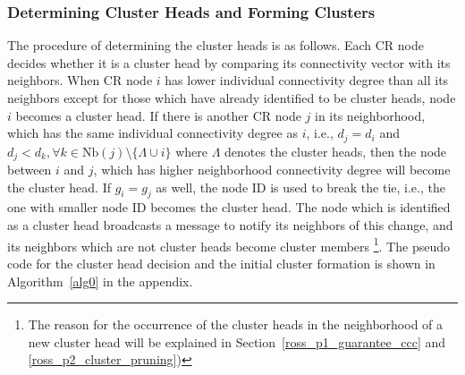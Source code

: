 \documentclass[times]{ettauth}
\newcommand{\ie}{i.e., }
\theoremstyle{mytheoremstyle}
\theoremstyle{mytheoremstyle}
\theoremstyle{mytheoremstyle}
\begin{document}
\subsubsection{Determining Cluster Heads and Forming Clusters}
The procedure of determining the cluster heads is as follows.
Each CR node decides whether it is a cluster head by comparing its connectivity vector with its neighbors.
When CR node $i$ has lower individual connectivity degree than all its neighbors except for those which have already identified to be cluster heads, node $i$ becomes a cluster head.
If there is another CR node $j$ in its neighborhood, which has the same individual connectivity degree as $i$, \ie $d_j = d_i$ and $d_j < d_{k}, \forall k\in \text{Nb}(j)\setminus \{\Lambda\cup i\}$ where $\Lambda$ denotes the cluster heads, then the node between $i$ and $j$, which has higher neighborhood connectivity degree will become the cluster head.
If $g_i = g_j$ as well, the node ID is used to break the tie, \ie the one with smaller node ID becomes the cluster head.
%
The node which is identified as a cluster head broadcasts a message to notify its neighbors of this change, and its neighbors which are not cluster heads become cluster members
\footnote{The reason for the occurrence of the cluster heads in the neighborhood of a new cluster head will be explained in Section~\ref{ross_p1_guarantee_ccc} and \ref{ross_p2_cluster_pruning})}.
The pseudo code for the cluster head decision and the initial cluster formation is shown in Algorithm~\ref{alg0} in the appendix.
\end{document}
